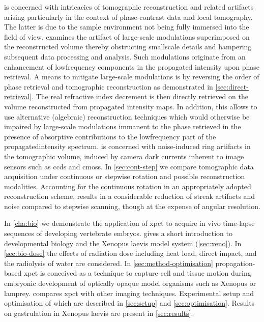 \documentclass[
twoside,
openright,
titlepage,
numbers=noenddot,
headinclude,
fleqn,
a4paper,
footinclude=true,
cleardoublepage=empty,
abstractoff,
BCOR=5mm,
paper=a4,
fontsize=11pt,
british,ngerman,american,
]{scrreprt}
\begin{document}
 is concerned with intricacies of tomographic
reconstruction and related artifacts arising particularly in the
context of phase-contrast data and local tomography.  The latter is
due to the sample environment not being fully immersed into the field
of view.   examines the artifact of large-scale
modulations superimposed on the reconstructed volume thereby
obstructing small\hyph scale details and hampering subsequent data
processing and analysis.  Such modulations originate from an
enhancement of low\hyph frequency components in the propagated
intensity upon phase retrieval.  A means to mitigate large-scale
modulations is by reversing the order of phase retrieval and
tomographic reconstruction as demonstrated in
\cref{sec:direct-retrieval}.  The real refractive index decrement is
then directly retrieved on the volume reconstructed from propagated
intensity maps.  In addition, this allows to use alternative
(algebraic) reconstruction techniques which would otherwise be
impaired by large-scale modulations immanent to the phase retrieved in
the presence of absorptive contributions to the low\hyph frequency
part of the propagated\hyph intensity spectrum.
 is concerned with noise-induced ring
artifacts in the tomographic volume, induced by camera dark currents
inherent to image sensors such as \acfp{ccd} and \acfp{cmos}.  In
\cref{sec:cont-step} we compare tomographic data acquisition under
continuous or stepwise rotation and possible reconstruction
modalities.  Accounting for the continuous rotation in an
appropriately adopted reconstruction scheme, results in a considerable
reduction of streak artifacts and noise compared to stepwise scanning,
though at the expense of angular resolution.

In \cref{cha:bio} we demonstrate the application of \acf{xpct} to
acquire in vivo time-lapse sequences of developing vertebrate embryos.
 gives a short introduction to developmental
biology and the Xenopus laevis model system (\cref{sec:xeno}).  In
\cref{sec:bio-dose} the effects of radiation dose including heat load,
direct impact, and the radiolysis of water are considered.  In
\cref{sec:method-optimisation} propagation-based \ac{xpct} is
conceived as a technique to capture cell and tissue motion during
embryonic development of optically opaque model organisms such as
Xenopus or lamprey.   compares \ac{xpct} with
other imaging techniques.  Experimental setup and optimisation of
which are described in \cref{sec:setup} and \cref{sec:optimisation}.
Results on gastrulation in Xenopus laevis are present in
\cref{sec:results}.
\end{document}
